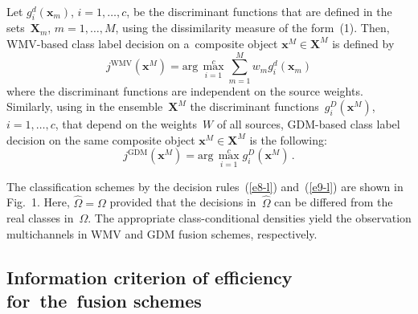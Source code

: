 \begin{multicols}{2}
\begin{figure*} %
  \vspace*{1pt}
    \begin{center}  
  \mbox{%
 \epsfxsize=107.799mm 
 }
\end{center}
\vspace*{-9pt}
\end{figure*}

Let $g_i^d(\mathbf{x}_m)$, $i=1,\ldots , c$, be the discriminant functions that are 
defined in the sets~$\mathbf{X}_m$, $m=1,\ldots , M$, using the dissimilarity 
measure of the form~(1). Then, WMV-based  class label decision on a~composite 
object $\mathbf{x}^M\in \mathbf{X}^M$ is defined by  
\begin{equation}
j^{\mathrm{WMV}}\left(\mathbf{x}^M\right) =\mathrm{arg}\,\max\limits^c_{i=1} 
\sum\limits^M_{m=1} w_m g_i^d\left(\mathbf{x}_m\right)
\label{e8-l}
\end{equation}
where the discriminant functions are independent on the source weights. Similarly, 
using in the ensemble~$\mathbf{X}^M$ the discriminant 
functions~$g_i^D(\mathbf{x}^M)$, $i=1,\ldots , c$, that depend on the 
weights~$W$ of all sources, GDM-based class label decision on the same 
composite object $\mathbf{x}^M\in \mathbf{X}^M$ is the following:
\begin{equation}
j^{\mathrm{GDM}}\left(\mathbf{x}^M\right) =\mathrm{arg}\,\max^c_{i=1} 
g_i^D\left(\mathbf{x}^M\right)\,.
\label{e9-l}
\end{equation}

        The classification schemes by the decision rules~(\ref{e8-l}) and~(\ref{e9-l}) 
are shown in Fig.~1. Here, $\hat{\Omega}=\Omega$ provided that the decisions 
in~$\hat{\Omega}$ can be differed from the real classes in~$\Omega$. The 
appropriate class-conditional densities yield the observation multichannels in 
WMV and GDM fusion schemes, respectively.




\subsection{Information criterion of efficiency for~the~fusion schemes}


\end{multicols}
